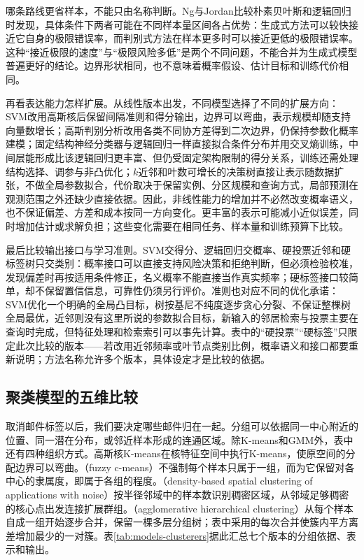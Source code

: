 哪条路线更省样本，不能只由名称判断。Ng与Jordan比较朴素贝叶斯和逻辑回归时发现，具体条件下两者可能在不同样本量区间各占优势：生成式方法可以较快接近它自身的极限错误率，而判别式方法在样本更多时可以接近更低的极限错误率。这种“接近极限的速度”与“极限风险多低”是两个不同问题，不能合并为生成式模型普遍更好的结论。边界形状相同，也不意味着概率假设、估计目标和训练代价相同。

再看表达能力怎样扩展。从线性版本出发，不同模型选择了不同的扩展方向：SVM改用高斯核后保留间隔准则和得分输出，边界可以弯曲，表示规模却随支持向量数增长；高斯判别分析改用各类不同协方差得到二次边界，仍保持参数化概率建模；固定结构神经分类器与逻辑回归一样直接拟合条件分布并用交叉熵训练，中间层能形成比该逻辑回归更丰富、但仍受固定架构限制的得分关系，训练还需处理结构选择、调参与非凸优化；$k$近邻和叶数可增长的决策树直接让表示随数据扩张，不做全局参数拟合，代价取决于保留实例、分区规模和查询方式，局部预测在观测范围之外还缺少直接依据。因此，非线性能力的增加并不必然改变概率语义，也不保证偏差、方差和成本按同一方向变化。更丰富的表示可能减小近似误差，同时增加估计或求解负担；这些变化需要在相同任务、样本量和训练预算下比较。

最后比较输出接口与学习准则。SVM交得分、逻辑回归交概率、硬投票近邻和硬标签树只交类别：概率接口可以直接支持风险决策和拒绝判断，但必须检验校准，发现偏差时再按适用条件修正，名义概率不能直接当作真实频率；硬标签接口较简单，却不保留置信信息，可靠性仍须另行评价。准则也对应不同的优化承诺：SVM优化一个明确的全局凸目标，树按基尼不纯度逐步贪心分裂、不保证整棵树全局最优，近邻则没有这里所说的参数拟合目标，新输入的邻居检索与投票主要在查询时完成，但特征处理和检索索引可以事先计算。表中的“硬投票”“硬标签”只限定此次比较的版本——若改用近邻频率或叶节点类别比例，概率语义和接口都要重新说明；方法名称允许多个版本，具体设定才是比较的依据。

\subsection{聚类模型的五维比较}
\label{sec:models-clustering-grid}

取消邮件标签以后，我们要决定哪些邮件归在一起。分组可以依据同一中心附近的位置、同一潜在分布，或邻近样本形成的连通区域。除K-means和GMM外，表中还有四种组织方式。高斯核K-means在核特征空间中执行K-means，使原空间的分配边界可以弯曲。（fuzzy c-means）不强制每个样本只属于一组，而为它保留对各中心的隶属度，即属于各组的程度。（density-based spatial clustering of applications with noise）按半径邻域中的样本数识别稠密区域，从邻域足够稠密的核心点出发连接扩展群组。（agglomerative hierarchical clustering）从每个样本自成一组开始逐步合并，保留一棵多层分组树；表中采用的每次合并使簇内平方离差增加最少的一对簇。表\ref{tab:models-clusterers}据此汇总七个版本的分组依据、表示和输出。

